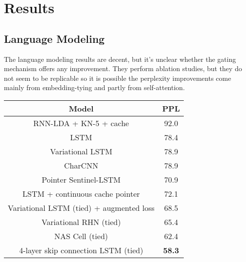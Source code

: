\documentclass{article}
\begin{document}
\section{Results}
\subsection{Language Modeling}

The language modeling results are decent, but it's unclear whether the
gating mechanism offers any improvement.
They perform ablation studies, but they do not seem to be replicable
so it is possible the perplexity improvements come 
mainly from embedding-tying and partly from self-attention.

\begin{table}[h!]                                                                 
\centering                                                                       
  \begin{tabular}{ c c }                                                         
    \toprule[2pt]                                                                
    Model & PPL \\                                                               
    \hline                                                                       
    RNN-LDA + KN-5 + cache \citep{mikolov2012context} &  92.0 \\                 
    LSTM \citep{zaremba2014recurrent} & 78.4 \\                                  
    Variational LSTM \citep{kim2016character} & 78.9 \\                          
    CharCNN \citep{kim2016character} & 78.9 \\                                   
    Pointer Sentinel-LSTM \citep{merity2016pointer} & 70.9 \\                    
    LSTM + continuous cache pointer \citep{grave2016improving} & 72.1 \\         
    Variational LSTM (tied) + augmented loss \citep{inan2016tying} & 68.5 \\     
    Variational RHN (tied) \citep{zilly2016recurrent} & 65.4 \\                  
    NAS Cell (tied)  \citep{zoph2016neural} & 62.4 \\                            
    4-layer skip connection LSTM (tied) \citep{melis2017state} & \textbf{58.3} \\

\end{tabular}
\end{table}
\end{document}
